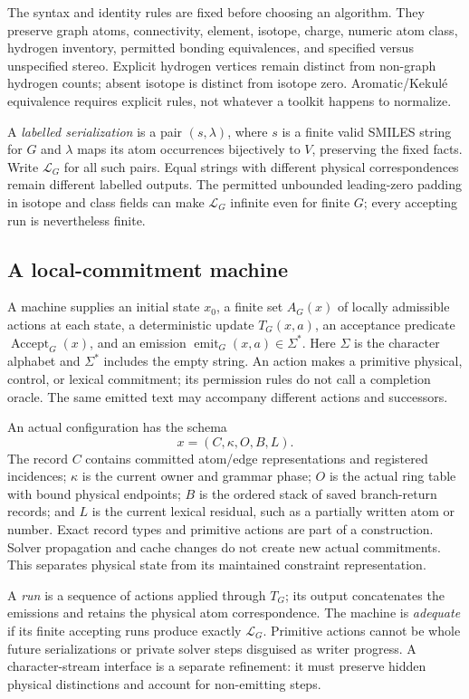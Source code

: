 \documentclass[11pt,a4paper]{article}
\newcommand{\Accept}{\operatorname{Accept}}
\newcommand{\cL}{\mathcal L}
\begin{document}
The syntax and identity rules are fixed before choosing an algorithm. They
preserve graph atoms, connectivity, element, isotope, charge, numeric atom class,
hydrogen inventory, permitted bonding equivalences, and specified versus
unspecified stereo. Explicit hydrogen vertices remain distinct from non-graph
hydrogen counts; absent isotope is distinct from isotope zero. Aromatic/Kekul\'e
equivalence requires explicit rules, not whatever a toolkit happens to
normalize.\cite{note126,note127}

A \emph{labelled serialization} is a pair \((s,\lambda)\), where \(s\) is a finite
valid SMILES string for \(G\) and \(\lambda\) maps its atom occurrences bijectively
to \(V\), preserving the fixed facts. Write \(\cL_G\) for all such pairs. Equal
strings with different physical correspondences remain different labelled
outputs. The permitted unbounded leading-zero padding in isotope and class fields
can make \(\cL_G\) infinite even for finite \(G\); every accepting run is nevertheless
finite.\cite{note127}

\subsection{A local-commitment machine}
A machine supplies an initial state \(x_0\), a finite set \(A_G(x)\) of locally
admissible actions at each state, a deterministic update \(T_G(x,a)\), an
acceptance predicate \(\Accept_G(x)\), and an emission
\(\operatorname{emit}_G(x,a)\in\Sigma^*\). Here \(\Sigma\) is the character alphabet
and \(\Sigma^*\) includes the empty string. An action makes a primitive physical,
control, or lexical commitment; its permission rules do not call a completion
oracle. The same emitted text may accompany different actions and successors.

An actual configuration has the schema
\[
  x=(C,\kappa,O,B,L).
\]
The record \(C\) contains committed atom/edge representations and registered
incidences; \(\kappa\) is the current owner and grammar phase; \(O\) is the actual
ring table with bound physical endpoints; \(B\) is the ordered stack of saved
branch-return records; and \(L\) is the current lexical residual, such as a
partially written atom or number. Exact record types and primitive actions are
part of a construction. Solver propagation and cache changes do not create new
actual commitments. This separates physical state from its maintained constraint
representation.\cite{note126}

A \emph{run} is a sequence of actions applied through \(T_G\); its output concatenates
the emissions and retains the physical atom correspondence. The machine is
\emph{adequate} if its finite accepting runs produce exactly \(\cL_G\). Primitive
actions cannot be whole future serializations or private solver steps disguised
as writer progress. A character-stream interface is a separate refinement: it
must preserve hidden physical distinctions and account for non-emitting steps.
\end{document}
